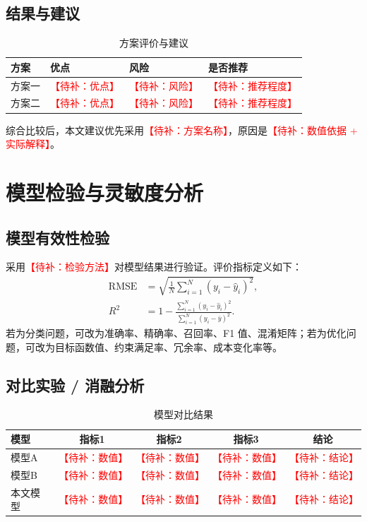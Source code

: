\documentclass[UTF8,a4paper,zihao=5]{ctexart}
\numberwithin{equation}{section}
\numberwithin{figure}{section}
\numberwithin{table}{section}
\newcommand{\todo}[1]{\textcolor{red}{【待补：#1】}}
\begin{document}
\subsection{结果与建议}
\begin{table}[H]
  \centering
  \caption{方案评价与建议}
  \begin{tabularx}{\linewidth}{lXXX}
    \toprule
    方案 & 优点 & 风险 & 是否推荐 \\
    \midrule
    方案一 & \todo{优点} & \todo{风险} & \todo{推荐程度} \\
    方案二 & \todo{优点} & \todo{风险} & \todo{推荐程度} \\
    \bottomrule
  \end{tabularx}
\end{table}

综合比较后，本文建议优先采用\todo{方案名称}，原因是\todo{数值依据 + 实际解释}。

\section{模型检验与灵敏度分析}

\subsection{模型有效性检验}
采用\todo{检验方法}对模型结果进行验证。评价指标定义如下：
\begin{align}
  \mathrm{RMSE} &= \sqrt{\frac{1}{N}\sum_{i=1}^{N}(y_i-\hat{y}_i)^2}, \\
  R^2 &= 1-\frac{\sum_{i=1}^{N}(y_i-\hat{y}_i)^2}{\sum_{i=1}^{N}(y_i-\bar{y})^2} .
\end{align}
若为分类问题，可改为准确率、精确率、召回率、F1 值、混淆矩阵；若为优化问题，可改为目标函数值、约束满足率、冗余率、成本变化率等。

\subsection{对比实验 / 消融分析}
\begin{table}[H]
  \centering
  \caption{模型对比结果}
  \begin{tabular}{lcccc}
    \toprule
    模型 & 指标1 & 指标2 & 指标3 & 结论 \\
    \midrule
    模型A & \todo{数值} & \todo{数值} & \todo{数值} & \todo{结论} \\
    模型B & \todo{数值} & \todo{数值} & \todo{数值} & \todo{结论} \\
    本文模型 & \todo{数值} & \todo{数值} & \todo{数值} & \todo{结论} \\
    \bottomrule
  \end{tabular}
\end{table}
\end{document}
